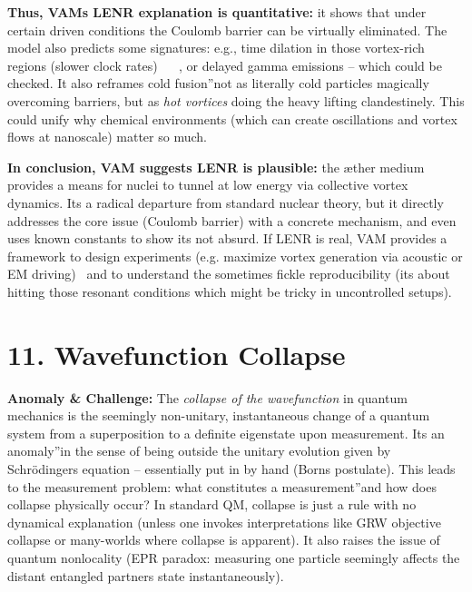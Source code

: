 \documentclass[a4paper, aps,preprint,superscriptaddress, 12pt]{revtex4}
\begin{document}
\textbf{Thus, VAM\rqs s LENR explanation is quantitative:} it shows that under certain driven conditions the Coulomb barrier can be virtually eliminated. The model also predicts some signatures: e.g., time dilation in those vortex-rich regions (slower clock rates)~\cite{Iskandarani2025a} ~\cite{Iskandarani2025a} , or delayed gamma emissions – which could be checked. It also reframes \grqq cold fusion\textquotedblright not as literally cold particles magically overcoming barriers, but as \textit{hot vortices} doing the heavy lifting clandestinely. This could unify why chemical environments (which can create oscillations and vortex flows at nanoscale) matter so much.


\textbf{In conclusion, VAM suggests LENR is plausible:} the æther medium provides a means for nuclei to tunnel at low energy via collective vortex dynamics. It\rqs s a radical departure from standard nuclear theory, but it directly addresses the core issue (Coulomb barrier) with a concrete mechanism, and even uses known constants to show it\rqs s not absurd. If LENR is real, VAM provides a framework to design experiments (e.g. maximize vortex generation via acoustic or EM driving)~\cite{Iskandarani2025a}  and to understand the sometimes fickle reproducibility (it\rqs s about hitting those resonant conditions which might be tricky in uncontrolled setups).


\section*{11. Wavefunction Collapse}

\textbf{Anomaly \& Challenge: } The \textit{collapse of the wavefunction} in quantum mechanics is the seemingly non-unitary, instantaneous change of a quantum system from a superposition to a definite eigenstate upon measurement. It\rqs s an \grqq anomaly\textquotedblright in the sense of being outside the unitary evolution given by Schrödinger\rqs s equation – essentially put in by hand (Born\rqs s postulate). This leads to the measurement problem: what constitutes a \grqq measurement\textquotedblright and how does collapse physically occur? In standard QM, collapse is just a rule with no dynamical explanation (unless one invokes interpretations like GRW objective collapse or many-worlds where collapse is apparent). It also raises the issue of quantum nonlocality (EPR paradox: measuring one particle seemingly affects the distant entangled partner\rqs s state instantaneously).
\end{document}
